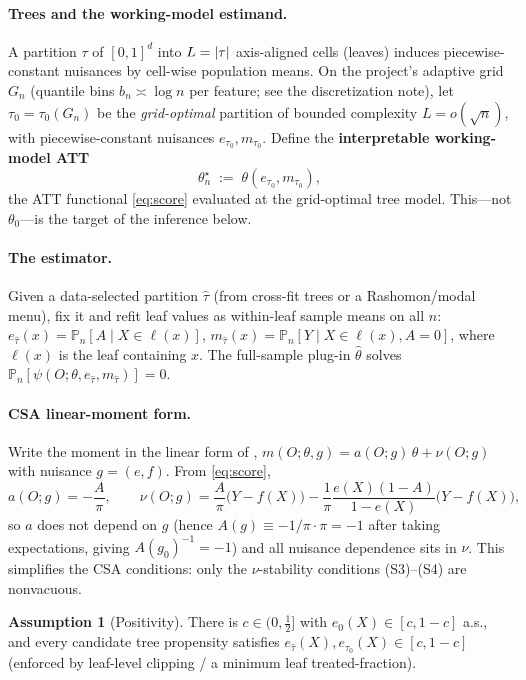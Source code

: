 \documentclass[11pt]{article}
\theoremstyle{plain}
\theoremstyle{definition}
\newtheorem{assumption}{Assumption}
\theoremstyle{remark}
\newcommand{\ez}{e_0}
\DeclarePairedDelimiter{\abs}{\lvert}{\rvert}
\newcommand{\Pn}{\mathbb{P}_n}
\newcommand{\eT}{e_{\hat\tau}}
\newcommand{\mT}{m_{\hat\tau}}
\newcommand{\etau}{e_{\tau_0}}
\newcommand{\mtau}{m_{\tau_0}}
\newcommand{\thstar}{\theta^{\star}_n}
\newcommand{\htheta}{\hat\theta}
\newcommand{\psiscore}{\psi}
\newcommand{\odiff}{o}
\begin{document}
\paragraph{Trees and the working-model estimand.}
A partition $\tau$ of $[0,1]^d$ into $L=\abs{\tau}$ axis-aligned cells (leaves)
induces piecewise-constant nuisances by cell-wise population means. On the
project's adaptive grid $G_n$ (quantile bins $b_n\asymp\log n$ per feature; see
the discretization note), let $\tau_0=\tau_0(G_n)$ be the \emph{grid-optimal}
partition of bounded complexity $L=\odiff(\sqrt n)$, with piecewise-constant
nuisances $\etau,\mtau$. Define the \textbf{interpretable working-model ATT}
\begin{equation}\label{eq:thetastar}
  \thstar \;:=\; \theta(\etau,\mtau),
\end{equation}
the ATT functional \eqref{eq:score} evaluated at the grid-optimal tree model.
This---not $\theta_0$---is the target of the inference below.

\paragraph{The estimator.}
Given a data-selected partition $\hat\tau$ (from cross-fit trees or a
Rashomon/modal menu), fix it and refit leaf values as within-leaf sample means
on all $n$: $\eT(x)=\Pn[A\mid X\in\ell(x)]$,
$\mT(x)=\Pn[Y\mid X\in\ell(x),A=0]$, where $\ell(x)$ is the leaf containing $x$.
The full-sample plug-in $\htheta$ solves $\Pn[\psiscore(O;\theta,\eT,\mT)]=0$.

\paragraph{CSA linear-moment form.}
Write the moment in the linear form of \citet{ChenSyrgkanisAustern2022},
$m(O;\theta,g)=a(O;g)\,\theta+\nu(O;g)$ with nuisance $g=(e,f)$. From
\eqref{eq:score},
\begin{equation}\label{eq:anu}
  a(O;g)=-\frac{A}{\pi},\qquad
  \nu(O;g)=\frac{A}{\pi}\bigl(Y-f(X)\bigr)
    -\frac{1}{\pi}\frac{e(X)(1-A)}{1-e(X)}\bigl(Y-f(X)\bigr),
\end{equation}
so $a$ does not depend on $g$ (hence $A(g)\equiv-1/\pi\cdot\pi=-1$ after taking
expectations, giving $A(g_0)^{-1}=-1$) and all nuisance dependence sits in
$\nu$. This simplifies the CSA conditions: only the $\nu$-stability
conditions (S3)--(S4) are nonvacuous.

\begin{assumption}[Positivity]\label{ass:positivity}
There is $c\in(0,\tfrac12]$ with $\ez(X)\in[c,1-c]$ a.s., and every candidate
tree propensity satisfies $\eT(X),\etau(X)\in[c,1-c]$ (enforced by leaf-level
clipping / a minimum leaf treated-fraction).
\end{assumption}
\end{document}
